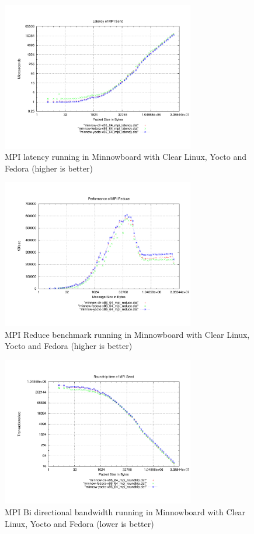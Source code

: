 \begin{figure}[H]
\centering
\includegraphics[width=0.75\textwidth]{images/mpbench_yocto_experiments/mpi_latency.pdf}
\caption{MPI latency running in Minnowboard with Clear Linux,
Yocto and Fedora (higher is better)}
\label{fig:5.12}
\end{figure}

\begin{figure}[H]
\centering
\includegraphics[width=0.75\textwidth]{images/mpbench_yocto_experiments/mpi_reduce.pdf}
\caption{MPI Reduce benchmark running in Minnowboard with Clear Linux, Yocto
and Fedora (higher is better)}
\label{fig:5.13}
\end{figure}

\begin{figure}[H]
\centering
\includegraphics[width=0.75\textwidth]{images/mpbench_yocto_experiments/mpi_roundtrip.pdf}
\caption{MPI Bi directional bandwidth running in Minnowboard with Clear Linux,
Yocto and Fedora (lower is better)}
\label{fig:5.14}
\end{figure}

